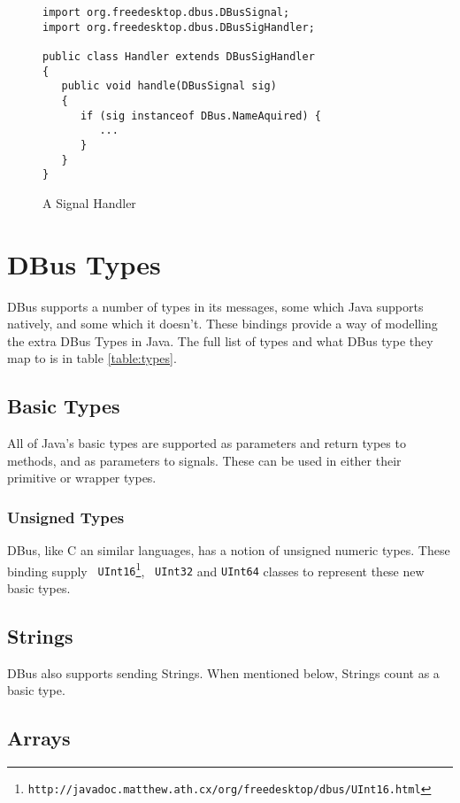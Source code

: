 \documentclass[a4paper,12pt]{article}
\begin{document}
\begin{figure}[htb]
\begin{center}
\begin{verbatim}
import org.freedesktop.dbus.DBusSignal;
import org.freedesktop.dbus.DBusSigHandler;

public class Handler extends DBusSigHandler
{
   public void handle(DBusSignal sig)
   {
      if (sig instanceof DBus.NameAquired) {
         ...
      }
   }
}
\end{verbatim}
\end{center}
\caption{A Signal Handler}
\label{fig:handler}
\end{figure}


\section{DBus Types}

DBus supports a number of types in its messages, some which Java
supports natively, and some which it doesn't. These bindings provide
a way of modelling the extra DBus Types in Java. The full list of
types and what DBus type they map to is in table \ref{table:types}.

\subsection{Basic Types}

All of Java's basic types are supported as parameters and return types to methods, and as parameters to signals. These can be used in either their primitive or wrapper types.

\subsubsection{Unsigned Types}

DBus, like C an similar languages, has a notion of unsigned numeric
types. These binding supply {\tt
UInt16\footnote{http://javadoc.matthew.ath.cx/org/freedesktop/dbus/UInt16.html}}, {\tt
UInt32} and {\tt UInt64} classes to represent these new basic types.

\subsection{Strings}

DBus also supports sending Strings. When mentioned below, Strings
count as a basic type.

\subsection{Arrays}
\end{document}
